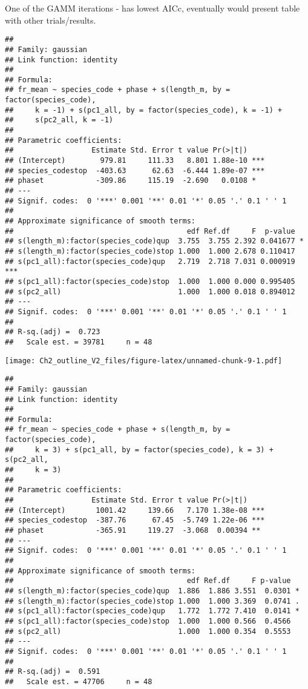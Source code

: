 \documentclass[]{article}
\begin{document}
One of the GAMM iterations - has lowest AICc, eventually would present
table with other trials/results.

\begin{verbatim}
## 
## Family: gaussian 
## Link function: identity 
## 
## Formula:
## fr_mean ~ species_code + phase + s(length_m, by = factor(species_code), 
##     k = -1) + s(pc1_all, by = factor(species_code), k = -1) + 
##     s(pc2_all, k = -1)
## 
## Parametric coefficients:
##                  Estimate Std. Error t value Pr(>|t|)    
## (Intercept)        979.81     111.33   8.801 1.88e-10 ***
## species_codestop  -403.63      62.63  -6.444 1.89e-07 ***
## phaset            -309.86     115.19  -2.690   0.0108 *  
## ---
## Signif. codes:  0 '***' 0.001 '**' 0.01 '*' 0.05 '.' 0.1 ' ' 1
## 
## Approximate significance of smooth terms:
##                                        edf Ref.df     F  p-value    
## s(length_m):factor(species_code)qup  3.755  3.755 2.392 0.041677 *  
## s(length_m):factor(species_code)stop 1.000  1.000 2.678 0.110417    
## s(pc1_all):factor(species_code)qup   2.719  2.718 7.031 0.000919 ***
## s(pc1_all):factor(species_code)stop  1.000  1.000 0.000 0.995405    
## s(pc2_all)                           1.000  1.000 0.018 0.894012    
## ---
## Signif. codes:  0 '***' 0.001 '**' 0.01 '*' 0.05 '.' 0.1 ' ' 1
## 
## R-sq.(adj) =  0.723   
##   Scale est. = 39781     n = 48
\end{verbatim}

\texttt{[image: Ch2\_outline\_V2\_files/figure-latex/unnamed-chunk-9-1.pdf]}

\begin{verbatim}
## 
## Family: gaussian 
## Link function: identity 
## 
## Formula:
## fr_mean ~ species_code + phase + s(length_m, by = factor(species_code), 
##     k = 3) + s(pc1_all, by = factor(species_code), k = 3) + s(pc2_all, 
##     k = 3)
## 
## Parametric coefficients:
##                  Estimate Std. Error t value Pr(>|t|)    
## (Intercept)       1001.42     139.66   7.170 1.38e-08 ***
## species_codestop  -387.76      67.45  -5.749 1.22e-06 ***
## phaset            -365.91     119.27  -3.068  0.00394 ** 
## ---
## Signif. codes:  0 '***' 0.001 '**' 0.01 '*' 0.05 '.' 0.1 ' ' 1
## 
## Approximate significance of smooth terms:
##                                        edf Ref.df     F p-value  
## s(length_m):factor(species_code)qup  1.886  1.886 3.551  0.0301 *
## s(length_m):factor(species_code)stop 1.000  1.000 3.369  0.0741 .
## s(pc1_all):factor(species_code)qup   1.772  1.772 7.410  0.0141 *
## s(pc1_all):factor(species_code)stop  1.000  1.000 0.566  0.4566  
## s(pc2_all)                           1.000  1.000 0.354  0.5553  
## ---
## Signif. codes:  0 '***' 0.001 '**' 0.01 '*' 0.05 '.' 0.1 ' ' 1
## 
## R-sq.(adj) =  0.591   
##   Scale est. = 47706     n = 48
\end{verbatim}
\end{document}

